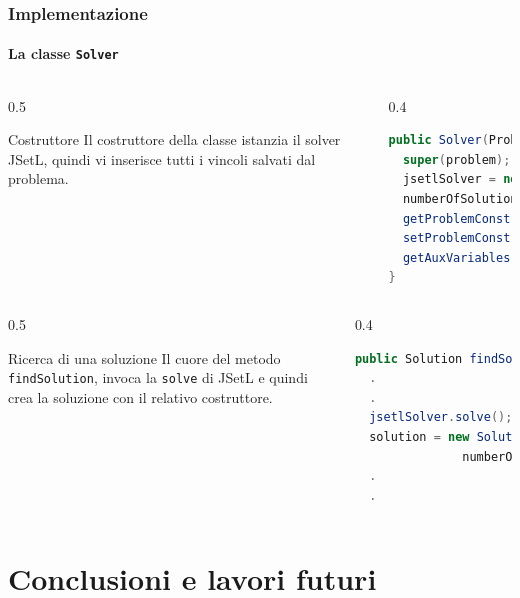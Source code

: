 \documentclass{beamer}
\begin{document}
\begin{frame}[fragile]
\frametitle{Implementazione}
\framesubtitle{La classe \texttt{Solver}}
\begin{columns}[t]
\begin{column}{0.5\textwidth}
\begin{block}{Costruttore}
Il costruttore della classe  istanzia il solver JSetL, quindi vi inserisce
tutti i vincoli salvati dal problema.
\end{block}
\end{column}
\begin{column}{0.4\textwidth}
\begin{lstlisting}[language = Java, linewidth = 130pt]
public Solver(Problem problem) {
  super(problem);
  jsetlSolver = new SolverClass();
  numberOfSolutions = 0;
  getProblemConstraints();
  setProblemConstraints();
  getAuxVariables();
}
\end{lstlisting}
\end{column}
\end{columns}

\pause

\begin{columns}
\begin{column}{0.5\textwidth}
\begin{block}{Ricerca di una soluzione}
Il cuore del metodo \alert{\texttt{findSolution}}, invoca la \texttt{solve}
di JSetL e quindi crea la soluzione con il relativo costruttore.
\end{block}
\end{column}

\begin{column}{0.4\textwidth}
\begin{lstlisting}[language = Java, linewidth = 140pt]
public Solution findSolution(ProblemState restoreOrNot) {
  .
  .
  jsetlSolver.solve();
  solution = new Solution(this,
               numberOfSolutions++);
  .
  .
\end{lstlisting}
\end{column}
\end{columns}
\end{frame}

\section{Conclusioni e lavori futuri}
\end{document}
